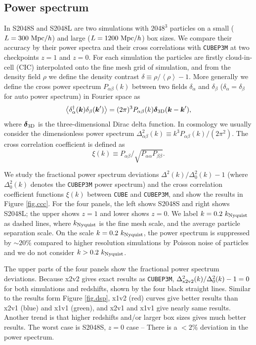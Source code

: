 \documentclass[10pt,twocolumn,preprint]{emulateapj}
\newcommand{\bs}{\boldsymbol}
\begin{document}
\subsection{Power spectrum}
In S2048S and S2048L are two simulations with $2048^3$ particles on a small ($L=300\ {\rm Mpc}/h$) and large ($L=1200\ {\rm Mpc}/h$) box sizes. We compare their accuracy by their power spectra and their cross correlations with {\tt CUBEP3M} at two checkpoints $z=1$ and $z=0$. For each simulation the particles are firstly cloud-in-cell (CIC) interpolated onto the fine mesh grid of simulation, and from the density field $\rho$ we define the density contrast $\delta\equiv \rho/\left\langle \rho \right\rangle-1$. More generally we define the cross power spectrum $P_{\alpha\beta}(k)$ between two fields $\delta_\alpha$ and $\delta_\beta$ ($\delta_\alpha=\delta_\beta$ for auto power spectrum) in Fourier space as
\begin{equation}\label{eq.cps}
	\left\langle \delta_\alpha^\dagger({\bs k})\delta_\beta({\bs k}') \right\rangle=
    (2\pi)^3 P_{\alpha\beta}(k){\bs \delta}_{\rm 3D}({\bs k}-{\bs k}'),
\end{equation}
where ${\bs \delta}_{\rm 3D}$ is the three-dimensional Dirac delta function. In cosmology we usually consider the dimensionless power spectrum $\Delta^2_{\alpha\beta}(k)\equiv k^3 P_{\alpha\beta}(k)/(2\pi^2)$. The cross correlation coefficient is defined as
\begin{equation}\label{eq.ccc}
	\xi(k)\equiv P_{\alpha\beta}/\sqrt{P_{\alpha\alpha}P_{\beta\beta}}.
\end{equation}

We study the fractional power spectrum deviations $\Delta^2(k)/\Delta^2_0(k)-1$ (where $\Delta^2_0(k)$ denotes the {\tt CUBEP3M} power spectrum) and the cross correlation coefficient functions $\xi(k)$ between {\tt CUBE} and {\tt CUBEP3M}, and show the results in Figure \ref{fig.ccc}. For the four panels, the left shows S2048S and right shows S2048L; the upper shows $z=1$ and lower shows $z=0$. We label $k=0.2\ k_{\rm Nyquist}$ as dashed lines, where $k_{\rm Nyquist}$ is the fine mesh scale, and the average particle separation scale. On the scale $k=0.2\ k_{\rm Nyquist}$, the power spectrum is suppressed by $\sim 20\%$ compared to higher resolution simulations by Poisson noise of particles and we do not consider $k>0.2\ k_{\rm Nyquist}$.

The upper parts of the four panels show the fractional power spectrum deviations. Because x2v2 gives exact results as {\tt CUBEP3M}, $\Delta^2_{\rm x2v2}(k)/\Delta^2_0(k)-1=0$ for both simulations and redshifts, shown by the four black straight lines. Similar to the results form Figure \ref{fig.dsp}, x1v2 (red) curves give better results than x2v1 (blue) and x1v1 (green), and x2v1 and x1v1 give nearly same results. Another trend is that higher redshifts and/or larger box sizes gives much better results. The worst case is S2048S, $z=0$ case -- There is a $<2\%$ deviation in the power spectrum.
\end{document}
